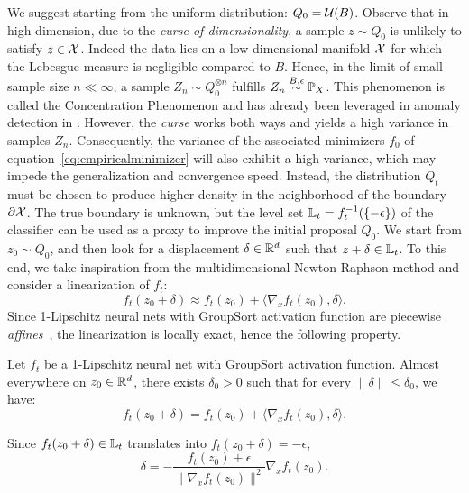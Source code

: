 We suggest starting from the uniform distribution: $Q_0=\mathcal{U}(B)$. Observe that in high dimension, due to the \textit{curse of dimensionality}, a sample $z\sim Q_0$ is unlikely to satisfy $z\in\mathcal{X}$. Indeed the data lies on a low dimensional manifold $\mathcal{X}$ for which the Lebesgue measure is negligible compared to $B$. Hence, in the limit of small sample size $n\ll\infty$, a sample ${Z_n\sim Q_0^{\otimes n}}$ fulfills ${Z_n\stackrel{B,\epsilon}{\sim}\mathbb{P}_X}$. This phenomenon is called the Concentration Phenomenon and has already been leveraged in anomaly detection in \cite{sipple_interpretable_2020}. However, the \textit{curse} works both ways and yields a high variance in samples $Z_n$. Consequently, the variance of the associated minimizers $f_0$ of equation~\ref{eq:empiricalminimizer} will also exhibit a high variance, which may impede the generalization and convergence speed. Instead, the distribution $Q_t$ must be chosen to produce higher density in the neighborhood of the boundary $\partial\mathcal{X}$. The true boundary is unknown, but the level set $\mathbb{L}_t=f_t^{-1}(\{-\epsilon\})$ of the classifier can be used as a proxy to improve the initial proposal $Q_0$. We start from $z_0\sim Q_0$, and then look for a displacement $\delta\in\mathbb{R}^d$ such that $z+\delta\in\mathbb{L}_t$. To this end, we take inspiration from the multidimensional Newton-Raphson method and consider a linearization of $f_t$:
\begin{equation}
    f_t(z_0+\delta) \approx f_t(z_0) + \langle \nabla_x f_t(z_0),\delta \rangle.
\end{equation}
Since 1-Lipschitz neural nets with GroupSort activation function are piecewise \textit{affines}~\cite{tanielian2021approximating}, the linearization is locally exact, hence the following property.
\begin{property}
Let $f_t$ be a 1-Lipschitz neural net with GroupSort activation function. Almost everywhere on $z_0\in\mathbb{R}^d$, there exists $\delta_0>0$ such that for every $\|\delta\|\leq \delta_0$, we have:
\begin{equation}
    f_t(z_0+\delta) = f_t(z_0) + \langle \nabla_x f_t(z_0),\delta \rangle.
\end{equation}
\end{property}

Since $f_t(z_0+\delta)\in \mathbb{L}_t$ translates into $f_t(z_0+\delta) = -\epsilon$,
\begin{equation}\label{eq:newton}
        \delta = -\frac{f_t(z_0)+\epsilon}{\|\nabla_x f_t(z_0)\|^2}\nabla_x f_t(z_0).
\end{equation}

